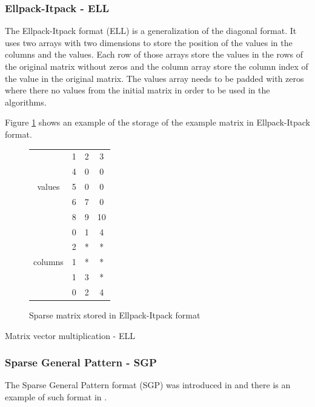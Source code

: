 \subsubsection{Ellpack-Itpack - ELL}
The Ellpack-Itpack format (ELL) is a generalization of the diagonal format.
It uses two arrays with two dimensions to store the position of the values in the columns and the values.
Each row of those arrays store the values in the rows of the original matrix without zeros and the column array store the column index of the value in the original matrix.
The values array needs to be padded with zeros where there no values from the initial matrix in order to be used in the algorithms.

Figure \ref{fig:methods:ell_ex} shows an example of the storage of the example matrix in Ellpack-Itpack format.


\begin{figure}
\centering
\begin{tabular}{c|ccc|}
	\cline{2-4}
	\multirow{5}{*}{values}  & 1 & 2 & 3  \\
	                         & 4 & 0 & 0  \\
	                         & 5 & 0 & 0  \\
	                         & 6 & 7 & 0  \\
	                         & 8 & 9 & 10 \\ \cline{2-4}
	\multirow{5}{*}{columns} & 0 & 1 & 4  \\
	                         & 2 & * & *  \\
	                         & 1 & * & *  \\
	                         & 1 & 3 & *  \\
	                         & 0 & 2 & 4  \\ \cline{2-4}
\end{tabular}
\caption{Sparse matrix stored in Ellpack-Itpack format \label{fig:methods:ell_ex}}
\end{figure}

\begin{algorithm}[h]
	\DontPrintSemicolon
	\caption{Matrix vector multiplication - ELL\label{fig:methods:ell_algo}}
\end{algorithm}

\subsubsection{Sparse General Pattern - SGP}
The Sparse General Pattern format (SGP) was introduced in \cite{Petit1991} and there is an example of such format in \cite{PetiE1996}.

